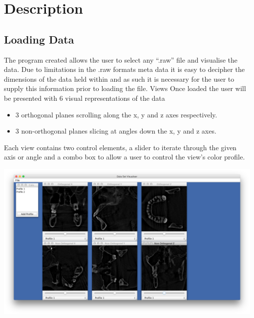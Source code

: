 \documentclass[pdftex,a4paper,10pt,titlepage]{article}
\begin{document}
\pagestyle{fancy}
\fancyhf{}
\cfoot{\thepage}




\section{Description}
\subsection{Loading Data}
The program created allows the user to select any “.raw” file and visualise the data. Due to limitations in the .raw formats meta data it is easy to decipher the dimensions of the data held within and as such it is necessary for the user to supply this information prior to loading the file. 
Views
Once loaded the user will be presented with 6 visual representations of the data 
\begin{itemize}
\item 3 orthogonal planes scrolling along the x, y and z axes respectively.
\item 3 non-orthogonal planes slicing at angles down the x, y and z axes.
\end{itemize}
Each view contains two control elements, a slider to iterate through the given axis or angle and a combo box to allow a user to control the view’s color profile.

\includegraphics[width=\textwidth]{screen1}
\end{document}
